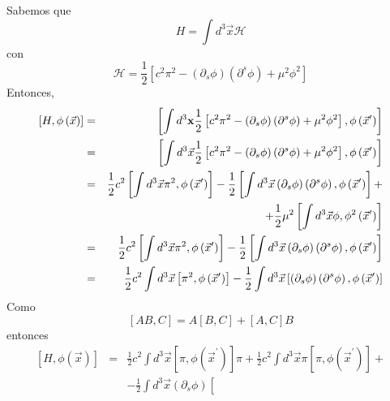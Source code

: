 \begin{enumerate}
Sabemos que
\begin{equation}
H=\int d^{3}\vec{x}\mathcal{H}
\end{equation}
con
\begin{equation}
\mathcal{H}=\frac{1}{2}\left[ c^{2}\pi ^{2}-\left( \partial _{s}\phi \right)
\left( \partial ^{s}\phi \right) +\mu ^{2}\phi ^{2}\right] 
\end{equation}
Entonces,
\begin{eqnarray*}
\left[ H,\phi \left( \vec{x}\right) \right] &=&\left[ \int d^{3}{\bf x%
}\frac{1}{2}\left[ c^{2}\pi ^{2}-\left( \partial _{s}\phi \right) \left(
\partial ^{s}\phi \right) +\mu ^{2}\phi ^{2}\right] ,\phi \left( \vec{x}%
^{\prime }\right) \right] \\
&=&\left[ \int d^{3}\vec{x}\frac{1}{2}\left[ c^{2}\pi ^{2}-\left(
\partial _{s}\phi \right) \left( \partial ^{s}\phi \right) +\mu ^{2}\phi ^{2}%
\right] ,\phi \left( \vec{x}^{\prime }\right) \right] \\
&=&\frac{1}{2}c^{2}\left[ \int d^{3}\vec{x}\pi ^{2},\phi \left( \vec{x}%
^{\prime }\right) \right] -\frac{1}{2}\left[ \int d^{3}\vec{x}\left(
\partial _{s}\phi \right) \left( \partial ^{s}\phi \right) ,\phi \left( 
\vec{x}^{\prime }\right) \right] + \\
&&+\frac{1}{2}\mu ^{2}\left[ \int d^{3}\vec{x}\phi ,\phi ^{2}\left( 
\vec{x}^{\prime }\right) \right] \\
&=&\frac{1}{2}c^{2}\left[ \int d^{3}\vec{x}\pi ^{2},\phi \left( \vec{x}%
^{\prime }\right) \right] -\frac{1}{2}\left[ \int d^{3}\vec{x}\left(
\partial _{s}\phi \right) \left( \partial ^{s}\phi \right) ,\phi \left( 
\vec{x}^{\prime }\right) \right] \\
&=&\frac{1}{2}c^{2}\int d^{3}\vec{x}\left[ \pi ^{2},\phi \left( \vec{x}%
^{\prime }\right) \right] -\frac{1}{2}\int d^{3}\vec{x}\left[ \left(
\partial _{s}\phi \right) \left( \partial ^{s}\phi \right) ,\phi \left( 
\vec{x}^{\prime }\right) \right] 
\end{eqnarray*}
Como
\begin{equation}
\left[ AB,C\right] =A\left[ B,C\right] +\left[ A,C\right] B
\end{equation}
entonces
\begin{eqnarray*}
\left[ H,\phi \left( \vec{x}\right) \right] &=&\frac{1}{2}c^{2}\int d^{3}%
\vec{x}\left[ \pi ,\phi \left( \vec{x}^{\prime }\right) \right] \pi +%
\frac{1}{2}c^{2}\int d^{3}\vec{x}\pi \left[ \pi ,\phi \left( \vec{x}%
^{\prime }\right) \right] + \\
&&-\frac{1}{2}\int d^{3}\vec{x}\left( \partial _{s}\phi \right) \left[

\end{eqnarray*}
\end{enumerate}
